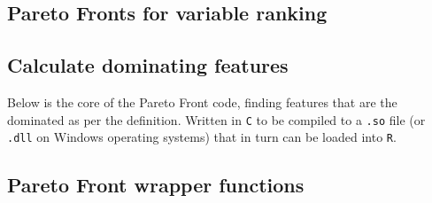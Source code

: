 \documentclass[12pt,a4paper,oneside]{report}
\begin{document}
\begin{appendix}
	

\clearpage



\section{Pareto Fronts for variable ranking} 



\clearpage

\subsection{Calculate dominating features} 

Below is the core of the Pareto Front code, finding features that are the dominated as per the definition. Written in {\tt C} to be compiled to a {\tt .so} file (or \texttt{.dll} on Windows operating systems) that in turn can be loaded into {\tt R}.

	

\clearpage

\subsection{Pareto Front wrapper functions} 

	


\end{appendix}







\end{document}
